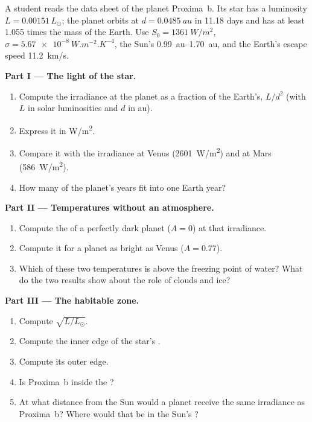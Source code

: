 \begin{problem}
\label{pb:g10:habitable-planet:1}
A student reads the data sheet of the planet Proxima~b. Its star has a
luminosity $L = 0.00151\,L_\odot$; the planet orbits at $d = \qty{0.0485}{au}$
in 11.18 days and has at least 1.055 times the mass of the Earth. Use
$S_0 = \qty{1361}{W/m^2}$, $\sigma = \qty{5.67e-8}{W.m^{-2}.K^{-4}}$, the
Sun's  \qtyrange{0.99}{1.70}{au}, and the Earth's escape speed
\qty{11.2}{km/s}.

\medskip
\noindent\textbf{Part I --- The light of the star.}
\begin{enumerate}
  \item Compute the irradiance at the planet as a fraction of the Earth's,
        $L/d^2$ (with $L$ in solar luminosities and $d$ in au).
  \item Express it in \unit{W/m^2}.
  \item Compare it with the irradiance at Venus (\qty{2601}{W/m^2}) and at
        Mars (\qty{586}{W/m^2}).
  \item How many of the planet's years fit into one Earth year?
\end{enumerate}

\medskip
\noindent\textbf{Part II --- Temperatures without an atmosphere.}
\begin{enumerate}[resume]
  \item Compute the  of a perfectly dark planet
        ($A = 0$) at that irradiance.
  \item Compute it for a planet as bright as Venus ($A = 0.77$).
  \item Which of these two temperatures is above the freezing point of
        water? What do the two results show about the role of clouds and
        ice?
\end{enumerate}

\medskip
\noindent\textbf{Part III --- The habitable zone.}
\begin{enumerate}[resume]
  \item Compute $\sqrt{L/L_\odot}$.
  \item Compute the inner edge of the star's .
  \item Compute its outer edge.
  \item Is Proxima~b inside the ?
  \item At what distance from the Sun would a planet receive the same
        irradiance as Proxima~b? Where would that be in the Sun's ?
\end{enumerate}


\end{problem}
